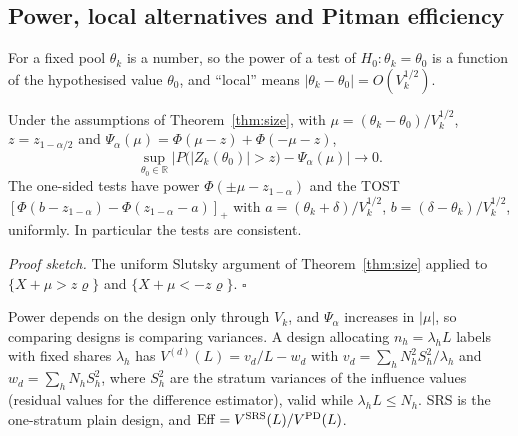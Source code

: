 \subsection{Power, local alternatives and Pitman efficiency}\label{sec:test-power}

For a fixed pool $\theta_k$ is a number, so the power of a test of $H_0:\theta_k=\theta_0$ is a function of the hypothesised value $\theta_0$, and ``local'' means $|\theta_k-\theta_0|=O(V_k^{1/2})$.

\begin{theorem}\label{thm:power}
Under the assumptions of Theorem~\ref{thm:size}, with $\mu=(\theta_k-\theta_0)/V_k^{1/2}$, $z=z_{1-\alpha/2}$ and $\Psi_\alpha(\mu)=\Phi(\mu-z)+\Phi(-\mu-z)$,
\begin{equation}\label{eq:power}
\sup_{\theta_0\in\mathbb R}\Big|P\big(|Z_k(\theta_0)|>z\big)-\Psi_\alpha(\mu)\Big|\to0 .
\end{equation}
The one-sided tests have power $\Phi(\pm\mu-z_{1-\alpha})$ and the TOST $[\Phi(b-z_{1-\alpha})-\Phi(z_{1-\alpha}-a)]_+$ with $a=(\theta_k+\delta)/V_k^{1/2}$, $b=(\delta-\theta_k)/V_k^{1/2}$, uniformly. In particular the tests are consistent.
\end{theorem}

\emph{Proof sketch.} The uniform Slutsky argument of Theorem~\ref{thm:size} applied to $\{X+\mu>z\varrho\}$ and $\{X+\mu<-z\varrho\}$. $\square$

Power depends on the design only through $V_k$, and $\Psi_\alpha$ increases in $|\mu|$, so comparing designs is comparing variances. A design allocating $n_h=\lambda_hL$ labels with fixed shares $\lambda_h$ has $V^{(d)}(L)=v_d/L-w_d$ with $v_d=\sum_hN_h^2S^2_h/\lambda_h$ and $w_d=\sum_hN_hS^2_h$, where $S^2_h$ are the stratum variances of the influence values (residual values for the difference estimator), valid while $\lambda_hL\le N_h$. SRS is the one-stratum plain design, and $\mathrm{Eff}=V^{\rm SRS}(L)/V^{\rm PD}(L)$.

